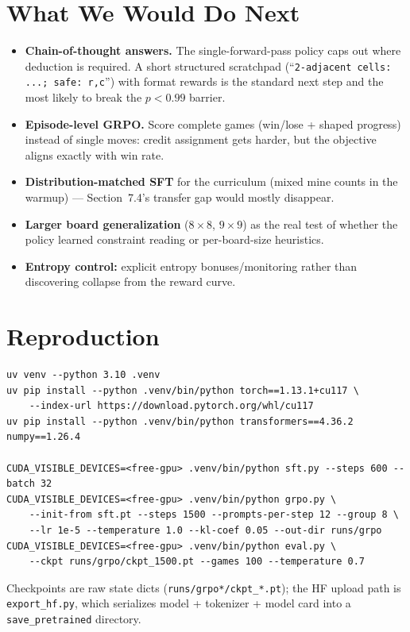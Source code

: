 \documentclass[11pt]{article}
\begin{document}
\section{What We Would Do Next}
\begin{itemize}
\item \textbf{Chain-of-thought answers.} The single-forward-pass policy caps
out where deduction is required. A short structured scratchpad
(``\texttt{2-adjacent cells: ...; safe: r,c}'') with format rewards is the
standard next step and the most likely to break the $p < 0.99$ barrier.
\item \textbf{Episode-level GRPO.} Score complete games (win/lose + shaped
progress) instead of single moves: credit assignment gets harder, but the
objective aligns exactly with win rate.
\item \textbf{Distribution-matched SFT} for the curriculum (mixed mine counts
in the warmup) --- Section~7.4's transfer gap would mostly disappear.
\item \textbf{Larger board generalization} ($8\times8$, $9\times9$) as the
real test of whether the policy learned constraint reading or per-board-size
heuristics.
\item \textbf{Entropy control:} explicit entropy bonuses/monitoring rather
than discovering collapse from the reward curve.
\end{itemize}

\section{Reproduction}
\begin{lstlisting}[language={}, caption={Full pipeline. Each GRPO variant fits in <6GB.}]
uv venv --python 3.10 .venv
uv pip install --python .venv/bin/python torch==1.13.1+cu117 \
    --index-url https://download.pytorch.org/whl/cu117
uv pip install --python .venv/bin/python transformers==4.36.2 numpy==1.26.4

CUDA_VISIBLE_DEVICES=<free-gpu> .venv/bin/python sft.py --steps 600 --batch 32
CUDA_VISIBLE_DEVICES=<free-gpu> .venv/bin/python grpo.py \
    --init-from sft.pt --steps 1500 --prompts-per-step 12 --group 8 \
    --lr 1e-5 --temperature 1.0 --kl-coef 0.05 --out-dir runs/grpo
CUDA_VISIBLE_DEVICES=<free-gpu> .venv/bin/python eval.py \
    --ckpt runs/grpo/ckpt_1500.pt --games 100 --temperature 0.7
\end{lstlisting}
Checkpoints are raw state dicts (\texttt{runs/grpo*/ckpt\_*.pt}); the HF
upload path is \texttt{export\_hf.py}, which serializes model + tokenizer +
model card into a \texttt{save\_pretrained} directory.
\end{document}
